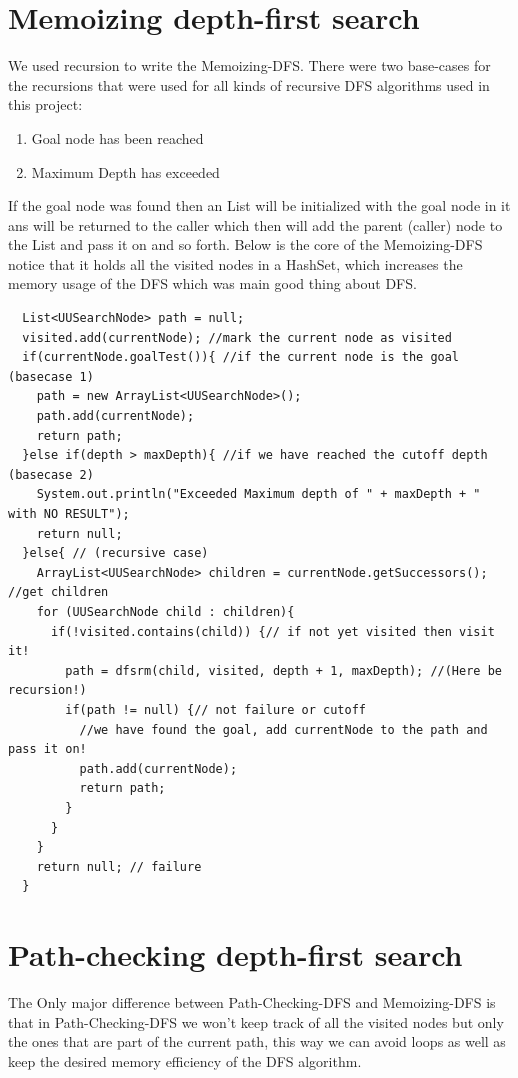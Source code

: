 \documentclass{article}
\begin{document}
\section{Memoizing depth-first search}
We used recursion to write the Memoizing-DFS. There were two base-cases for the recursions that were used for all kinds of recursive DFS algorithms used in this project:
\begin{enumerate}
\item Goal node has been reached
\item Maximum Depth has exceeded
\end{enumerate}
If the goal node was found then an List will be initialized with the goal node in it ans will be returned to the caller which then will add the parent (caller) node to the List and pass it on and so forth.
Below is the core of the Memoizing-DFS notice that it holds all the visited nodes in a HashSet, which increases the memory usage of the DFS which was main good thing about DFS.
\begin{lstlisting}
  List<UUSearchNode> path = null;
  visited.add(currentNode); //mark the current node as visited
  if(currentNode.goalTest()){ //if the current node is the goal (basecase 1)
    path = new ArrayList<UUSearchNode>();
    path.add(currentNode);
    return path;
  }else if(depth > maxDepth){ //if we have reached the cutoff depth (basecase 2)
    System.out.println("Exceeded Maximum depth of " + maxDepth + " with NO RESULT");
    return null;
  }else{ // (recursive case)
    ArrayList<UUSearchNode> children = currentNode.getSuccessors(); //get children
    for (UUSearchNode child : children){
      if(!visited.contains(child)) {// if not yet visited then visit it!
        path = dfsrm(child, visited, depth + 1, maxDepth); //(Here be recursion!)
        if(path != null) {// not failure or cutoff
          //we have found the goal, add currentNode to the path and pass it on!
          path.add(currentNode);
          return path;
        }
      }
    }
    return null; // failure
  }
\end{lstlisting}

\section{Path-checking depth-first search}
The Only major difference between Path-Checking-DFS and Memoizing-DFS is that in Path-Checking-DFS we won't keep track of all the visited nodes but only the ones that are part of the current path, this way we can avoid loops as well as keep the desired memory efficiency of the DFS algorithm.
\end{document}
